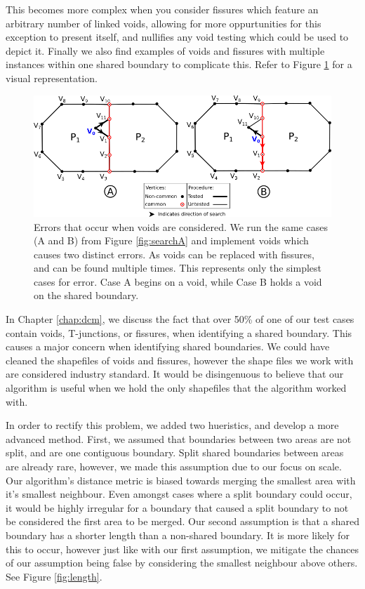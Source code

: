  This becomes more complex when you consider fissures which feature an arbitrary number of linked voids, allowing for more oppurtunities for this exception to present itself, and nullifies any void testing which could be used to depict it. Finally we also find examples of voids and fissures with multiple instances within one shared boundary to complicate this. Refer to Figure \ref{fig:searchB} for a visual representation.
 
 \begin{figure}[t]
\includegraphics[width=1\textwidth]{images/ch6/caseB}
\caption{Errors that occur when voids are considered. We run the same cases (A and B) from Figure \ref{fig:searchA} and implement voids which causes two distinct errors. As voids can be replaced with fissures, and can be found multiple times. This represents only the simplest cases for error. Case A begins on a void, while Case B holds a void on the shared boundary.} \label{fig:searchB}
\end{figure}

In Chapter \ref{chap:dcm}, we discuss the fact that over 50\% of one of our test cases contain voids, T-junctions, or fissures, when identifying a shared boundary. This causes a major concern when identifying shared boundaries. We could have cleaned the shapefiles of voids and fissures, however the shape files we work with are considered industry standard. It would be disingenuous to believe that our algorithm is useful when we hold the only shapefiles that the algorithm worked with.



In order to rectify this problem, we added two hueristics, and develop a more advanced method.
First, we assumed that boundaries between two areas are not split, and are one contiguous boundary. Split shared boundaries between areas are already rare, however, we made this assumption due to our focus on scale. Our algorithm's distance metric is biased towards merging the smallest area with it's smallest neighbour. Even amongst cases where a split boundary could occur, it would be highly irregular for a boundary that caused a split boundary to not be considered the first area to be merged. 
Our second assumption is that a shared boundary has a shorter length than a non-shared boundary. It is more likely for this to occur, however just like with our first assumption, we mitigate the chances of our assumption being false by considering the smallest neighbour above others. See Figure \ref{fig:length}.

